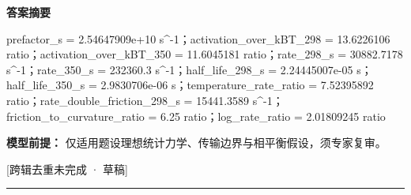 \documentclass[UTF8,11pt,a4paper]{ctexart}
\begin{document}
\noindent\textbf{答案摘要}\par
prefactor\_s = 2.54647909e+10 s\textasciicircum{}-1；activation\_over\_kBT\_298 = 13.6226106 ratio；activation\_over\_kBT\_350 = 11.6045181 ratio；rate\_298\_s = 30882.7178 s\textasciicircum{}-1；rate\_350\_s = 232360.3 s\textasciicircum{}-1；half\_life\_298\_s = 2.24445007e-05 s；half\_life\_350\_s = 2.9830706e-06 s；temperature\_rate\_ratio = 7.52395892 ratio；rate\_double\_friction\_298\_s = 15441.3589 s\textasciicircum{}-1；friction\_to\_curvature\_ratio = 6.25 ratio；log\_rate\_ratio = 2.01809245 ratio\par
\noindent\textbf{模型前提：}
仅适用题设理想统计力学、传输边界与相平衡假设，须专家复审。\par
\noindent\textcolor{red!65!black}{[跨辑去重未完成 · 草稿]} \par
\medskip\hrule\medskip
{}
\end{document}
